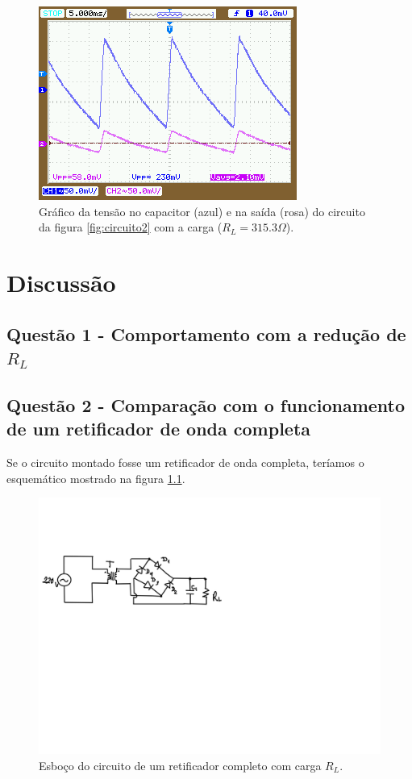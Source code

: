 \documentclass{abntex2}
\begin{document}
\begin{figure}[h]
  \centering
  \includegraphics[scale = 0.7]{exp2-5.png}
  \caption{Gráfico da tensão no capacitor (azul) e na saída (rosa) do circuito da figura \ref{fig:circuito2} com a carga ($R_L = 315.3\Omega$).}
  \label{fig:graf5}
\end{figure}
\pagebreak
\chapter{Discussão}

\section{Questão 1 - Comportamento com a redução de $R_L$}

\section{Questão 2 - Comparação com o funcionamento de um retificador de onda completa}

Se o circuito montado fosse um retificador de onda completa, teríamos o esquemático mostrado na figura \ref{fig:retComp}.

\begin{figure}[h]
  \centering
  \includegraphics[scale = .7]{retComp.png}
  \caption{Esboço do circuito de um retificador completo com carga $R_L$.}
  \label{fig:retComp}
\end{figure}
\end{document}
